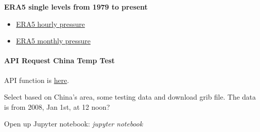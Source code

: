 \documentclass[
]{book}
\providecommand{\tightlist}{%
  \setlength{\itemsep}{0pt}\setlength{\parskip}{0pt}}
\begin{document}
\textbf{ERA5 single levels from 1979 to present}

\begin{itemize}
\tightlist
\item
  \href{https://cds.climate.copernicus.eu/cdsapp\#!/dataset/reanalysis-era5-single-levels}{ERA5 hourly pressure}
\item
  \href{https://cds.climate.copernicus.eu/cdsapp\#!/dataset/reanalysis-era5-single-levels-monthly-means}{ERA5 monthly pressure}
\end{itemize}

\hypertarget{api-request-china-temp-test}{%
\paragraph{API Request China Temp Test}\label{api-request-china-temp-test}}

API function is \href{https://github.com/ecmwf/cdsapi/blob/master/cdsapi/api.py}{here}.

Select based on China's area, some testing data and download grib file. The data is from 2008, Jan 1st, at 12 noon?

Open up Jupyter notebook: \emph{jupyter notebook}
\end{document}
